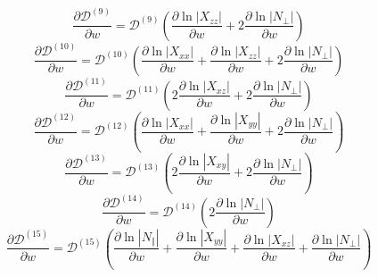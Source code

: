 \documentclass[a4paper,12pt]{article}%
\begin{document}
\begin{equation}
\frac{\partial\mathcal{D}^{\left(  9\right)  }}{\partial w}=\mathcal{D}%
^{\left(  9\right)  }\left(  \frac{\partial\ln\left\vert X_{zz}\right\vert
}{\partial w}+2\frac{\partial\ln\left\vert N_{\bot}\right\vert }{\partial
w}\right)
\end{equation}%
\begin{equation}
\frac{\partial\mathcal{D}^{\left(  10\right)  }}{\partial w}=\mathcal{D}%
^{\left(  10\right)  }\left(  \frac{\partial\ln\left\vert X_{xx}\right\vert
}{\partial w}+\frac{\partial\ln\left\vert X_{zz}\right\vert }{\partial
w}+2\frac{\partial\ln\left\vert N_{\bot}\right\vert }{\partial w}\right)
\end{equation}%
\begin{equation}
\frac{\partial\mathcal{D}^{\left(  11\right)  }}{\partial w}=\mathcal{D}%
^{\left(  11\right)  }\left(  2\frac{\partial\ln\left\vert X_{xz}\right\vert
}{\partial w}+2\frac{\partial\ln\left\vert N_{\bot}\right\vert }{\partial
w}\right)
\end{equation}%
\begin{equation}
\frac{\partial\mathcal{D}^{\left(  12\right)  }}{\partial w}=\mathcal{D}%
^{\left(  12\right)  }\left(  \frac{\partial\ln\left\vert X_{xx}\right\vert
}{\partial w}+\frac{\partial\ln\left\vert X_{yy}\right\vert }{\partial
w}+2\frac{\partial\ln\left\vert N_{\bot}\right\vert }{\partial w}\right)
\end{equation}%
\begin{equation}
\frac{\partial\mathcal{D}^{\left(  13\right)  }}{\partial w}=\mathcal{D}%
^{\left(  13\right)  }\left(  2\frac{\partial\ln\left\vert X_{xy}\right\vert
}{\partial w}+2\frac{\partial\ln\left\vert N_{\bot}\right\vert }{\partial
w}\right)
\end{equation}%
\begin{equation}
\frac{\partial\mathcal{D}^{\left(  14\right)  }}{\partial w}=\mathcal{D}%
^{\left(  14\right)  }\left(  2\frac{\partial\ln\left\vert N_{\bot}\right\vert
}{\partial w}\right)
\end{equation}%
\begin{equation}
\frac{\partial\mathcal{D}^{\left(  15\right)  }}{\partial w}=\mathcal{D}%
^{\left(  15\right)  }\left(  \frac{\partial\ln\left\vert N_{\Vert}\right\vert
}{\partial w}+\frac{\partial\ln\left\vert X_{yy}\right\vert }{\partial
w}+\frac{\partial\ln\left\vert X_{xz}\right\vert }{\partial w}+\frac
{\partial\ln\left\vert N_{\bot}\right\vert }{\partial w}\right)
\end{equation}%
\end{document}
